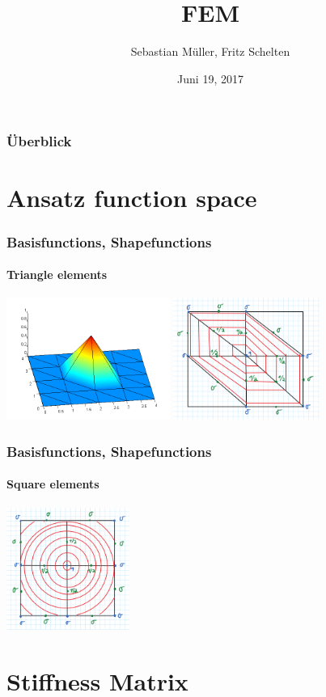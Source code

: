 \documentclass[mathserif]{beamer}
\title{FEM}
\author{Sebastian Müller, Fritz Schelten}
\date{Juni 19, 2017}
\begin{document}
\begin{frame}
\titlepage
\end{frame}

\begin{frame}
\frametitle{Überblick}
\tableofcontents
\end{frame}

\section{Ansatz function space}

\begin{frame}
	\frametitle{Basisfunctions, Shapefunctions}
	\framesubtitle{Triangle elements}
	\includegraphics[height=4cm]{triangleplot.png}
	\includegraphics[height=4cm]{triangles.PNG}
\end{frame}

\begin{frame}
	\frametitle{Basisfunctions, Shapefunctions}
	\framesubtitle{Square elements}
	\includegraphics[height=4cm]{squares.PNG}
\end{frame}

\section{Stiffness Matrix}
\end{document}
